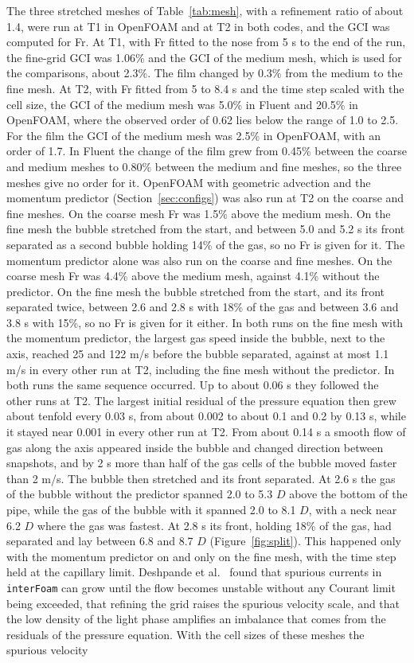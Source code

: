 \documentclass[11pt,a4paper]{article}
\begin{document}
The three stretched meshes of Table~\ref{tab:mesh}, with a refinement ratio of about 1.4, were run at T1 in OpenFOAM and at T2 in both codes, and the GCI \cite{Celik2008} was computed for Fr. At T1, with Fr fitted to the nose from 5 s to the end of the run, the fine-grid GCI was 1.06\% and the GCI of the medium mesh, which is used for the comparisons, about 2.3\%. The film changed by 0.3\% from the medium to the fine mesh. At T2, with Fr fitted from 5 to 8.4 s and the time step scaled with the cell size, the GCI of the medium mesh was 5.0\% in Fluent and 20.5\% in OpenFOAM, where the observed order of 0.62 lies below the range of 1.0 to 2.5. For the film the GCI of the medium mesh was 2.5\% in OpenFOAM, with an order of 1.7. In Fluent the change of the film grew from 0.45\% between the coarse and medium meshes to 0.80\% between the medium and fine meshes, so the three meshes give no order for it. OpenFOAM with geometric advection and the momentum predictor (Section~\ref{sec:configs}) was also run at T2 on the coarse and fine meshes. On the coarse mesh Fr was 1.5\% above the medium mesh. On the fine mesh the bubble stretched from the start, and between 5.0 and 5.2 s its front separated as a second bubble holding 14\% of the gas, so no Fr is given for it. The momentum predictor alone was also run on the coarse and fine meshes. On the coarse mesh Fr was 4.4\% above the medium mesh, against 4.1\% without the predictor. On the fine mesh the bubble stretched from the start, and its front separated twice, between 2.6 and 2.8 s with 18\% of the gas and between 3.6 and 3.8 s with 15\%, so no Fr is given for it either. In both runs on the fine mesh with the momentum predictor, the largest gas speed inside the bubble, next to the axis, reached 25 and 122 m/s before the bubble separated, against at most 1.1 m/s in every other run at T2, including the fine mesh without the predictor. In both runs the same sequence occurred. Up to about 0.06 s they followed the other runs at T2. The largest initial residual of the pressure equation then grew about tenfold every 0.03 s, from about 0.002 to about 0.1 and 0.2 by 0.13 s, while it stayed near 0.001 in every other run at T2. From about 0.14 s a smooth flow of gas along the axis appeared inside the bubble and changed direction between snapshots, and by 2 s more than half of the gas cells of the bubble moved faster than 2 m/s. The bubble then stretched and its front separated. At 2.6 s the gas of the bubble without the predictor spanned 2.0 to 5.3 $D$ above the bottom of the pipe, while the gas of the bubble with it spanned 2.0 to 8.1 $D$, with a neck near 6.2 $D$ where the gas was fastest. At 2.8 s its front, holding 18\% of the gas, had separated and lay between 6.8 and 8.7 $D$ (Figure~\ref{fig:split}). This happened only with the momentum predictor on and only on the fine mesh, with the time step held at the capillary limit. Deshpande et al.\ \cite{deshpande2012evaluating} found that spurious currents in \texttt{interFoam} can grow until the flow becomes unstable without any Courant limit being exceeded, that refining the grid raises the spurious velocity scale, and that the low density of the light phase amplifies an imbalance that comes from the residuals of the pressure equation. With the cell sizes of these meshes the spurious velocity 
\end{document}
